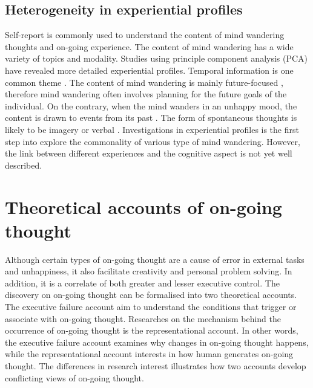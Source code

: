 \subsection{Heterogeneity in experiential profiles}
Self-report is commonly used to understand the content of mind wandering thoughts and on-going experience. The content of mind wandering has a wide variety of topics and modality. Studies using principle component analysis (PCA) have revealed more detailed experiential profiles. Temporal information is one common theme \cite{RubyFP2013,RubyPlos2013}. The content of mind wandering is mainly future-focused \cite{Baird2011}, therefore mind wandering often involves planning for the future goals of the individual. On the contrary, when the mind wanders in an unhappy mood, the content is drawn to events from its past \cite{Smallwood2011}. The form of spontaneous thoughts is likely to be imagery or verbal \cite{Gorgolewski2014,Smallwood2016}. Investigations in experiential profiles is the first step into explore the commonality of various type of mind wandering. However, the link between different experiences and the cognitive aspect is not yet well described.  



\section{Theoretical accounts of on-going thought}

Although certain types of on-going thought are a cause of error in external tasks and unhappiness, it also facilitate creativity and personal problem solving. In addition, it is a correlate of both greater and lesser executive control. The discovery on on-going thought can be formalised into two theoretical accounts. The executive failure account aim to understand the conditions that trigger or associate with on-going thought. Researches on the mechanism behind the occurrence of on-going thought is the representational account. In other words, the executive failure account examines why changes in on-going thought happens, while the representational account interests in how human generates on-going thought. The differences in research interest illustrates how two accounts develop conflicting views of on-going thought. 

